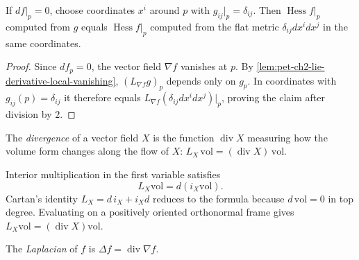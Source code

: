 \begin{proposition}
  \label{prop:pet-ch2-hessian-critical-point}
  \leanok
  If $df|_p=0$, choose coordinates $x^i$ around $p$ with $g_{ij}|_p=\delta_{ij}$.
  Then $\operatorname{Hess}f|_p$ computed from $g$ equals $\operatorname{Hess}f|_p$
  computed from the flat metric $\delta_{ij}dx^idx^j$ in the same coordinates.
\end{proposition}
\begin{proof}
  \leanok
  \sketch
  Since $df_p=0$, the vector field
  $\nabla f$ vanishes at $p$. By
  \cref{lem:pet-ch2-lie-derivative-local-vanishing},
  $(L_{\nabla f}g)_p$ depends only on $g_p$. In coordinates with
  $g_{ij}(p)=\delta_{ij}$ it therefore equals
  $L_{\nabla f}(\delta_{ij}dx^i dx^j)|_p$, proving the claim after division
  by $2$.
\end{proof}

\begin{definition}
  \label{def:pet-ch2-divergence-lie-derivative}
  \leanok
  The \emph{divergence} of a vector field $X$ is the function $\operatorname{div}X$
  measuring how the volume form changes along the flow of $X$:
  $L_X\,\mathrm{vol}=(\operatorname{div}X)\,\mathrm{vol}$.
\end{definition}

\begin{remark}
  \label{rem:pet-ch2-lie-derivative-volume-exact}
  \leanok
  Interior multiplication in
  the first variable satisfies
  \[
    L_X\mathrm{vol}=d(i_X\mathrm{vol}).
  \]
  \sketch
  Cartan's identity $L_X=d\,i_X+i_Xd$ reduces to the formula because
  $d\,\mathrm{vol}=0$ in top degree. Evaluating on a positively oriented
  orthonormal frame gives
  $L_X\mathrm{vol}=(\operatorname{div}X)\mathrm{vol}$.
\end{remark}

\begin{definition}[Laplacian]
  \label{def:pet-ch2-laplacian}
  \leanok
  The \emph{Laplacian} of $f$ is $\Delta f=\operatorname{div}\nabla f$.
\end{definition}

